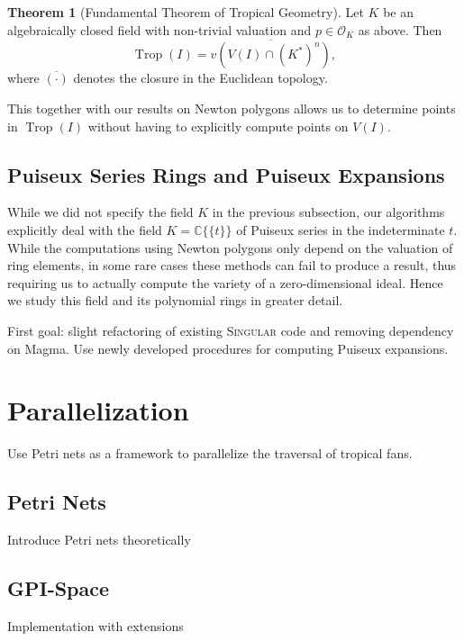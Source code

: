 \documentclass[
  paper=a4,
  DIV=14,
  fontsize=12pt,
  titlepage,
  bibliography=totoc,
  pagesize=pdftex
]{scrartcl}
\numberwithin{figure}{section}
\numberwithin{equation}{section}
\numberwithin{table}{section}
\newcommand*\setC{\mathds{C}}
\newcommand*\puiseux[2]{#1\{\!\{#2\}\!\}}
\newcommand*\CCt{\puiseux{\setC}{t}}
\DeclareMathOperator{\Trop}{Trop}
\theoremstyle{definition}
\newtheorem{theorem}[definition]{Theorem}
\numberwithin{definition}{section}
\begin{document}
\begin{theorem}[Fundamental Theorem of Tropical Geometry]
  Let $K$ be an algebraically closed field with non-trivial valuation and $p\in \mathcal
  O_K$ as above. Then
  \[
    \Trop(I) = \overline{v(V(I) \cap (K^\ast)^n)},
  \]
  where $\overline{(\cdot)}$ denotes the closure in the Euclidean topology.
  \label{thm:fundamentalThmTropicalGeometry}
\end{theorem}

This together with our results on Newton polygons allows us to determine points in
$\Trop(I)$ without having to explicitly compute points on $V(I)$.

\subsection{Puiseux Series Rings and Puiseux Expansions}

While we did not specify the field $K$ in the previous subsection, our algorithms
explicitly deal with the field $K = \CCt$ of Puiseux series in the indeterminate
$t$. While the computations using Newton polygons only depend on the valuation of ring
elements, in some rare cases these methods can fail to produce a result, thus requiring us
to actually compute the variety of a zero-dimensional ideal. Hence we study this field and
its polynomial rings in greater detail.

First goal: slight refactoring of existing \textsc{Singular} code and removing dependency on
Magma. Use newly developed procedures for computing Puiseux expansions.

\section{Parallelization}

Use Petri nets as a framework to parallelize the traversal of tropical fans.

\subsection{Petri Nets}

Introduce Petri nets theoretically

\subsection{GPI-Space}

Implementation with extensions
\end{document}
